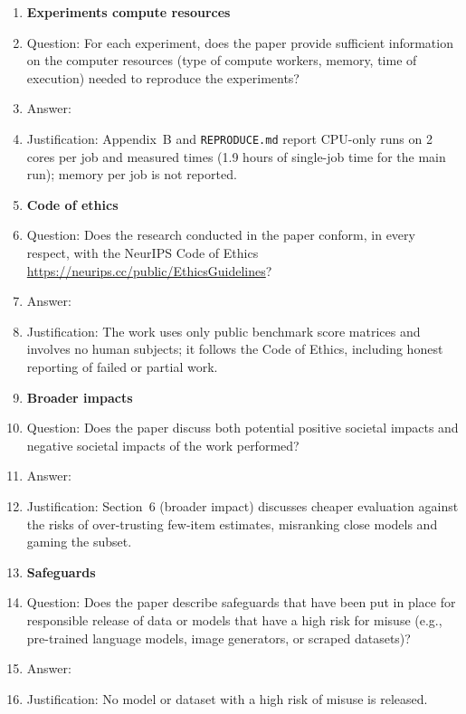\begin{enumerate}
\item {\bf Experiments compute resources}
    \item[] Question: For each experiment, does the paper provide sufficient information on the computer resources (type of compute workers, memory, time of execution) needed to reproduce the experiments?
    \item[] Answer: \answerYes{} %
    \item[] Justification: Appendix~B and \texttt{REPRODUCE.md} report CPU-only runs on 2 cores per job and measured times (1.9 hours of single-job time for the main run); memory per job is not reported.
    
\item {\bf Code of ethics}
    \item[] Question: Does the research conducted in the paper conform, in every respect, with the NeurIPS Code of Ethics \url{https://neurips.cc/public/EthicsGuidelines}?
    \item[] Answer: \answerYes{} %
    \item[] Justification: The work uses only public benchmark score matrices and involves no human subjects; it follows the Code of Ethics, including honest reporting of failed or partial work.


\item {\bf Broader impacts}
    \item[] Question: Does the paper discuss both potential positive societal impacts and negative societal impacts of the work performed?
    \item[] Answer: \answerYes{} %
    \item[] Justification: Section~6 (broader impact) discusses cheaper evaluation against the risks of over-trusting few-item estimates, misranking close models and gaming the subset.
    
\item {\bf Safeguards}
    \item[] Question: Does the paper describe safeguards that have been put in place for responsible release of data or models that have a high risk for misuse (e.g., pre-trained language models, image generators, or scraped datasets)?
    \item[] Answer: \answerNA{} %
    \item[] Justification: No model or dataset with a high risk of misuse is released.


\end{enumerate}
